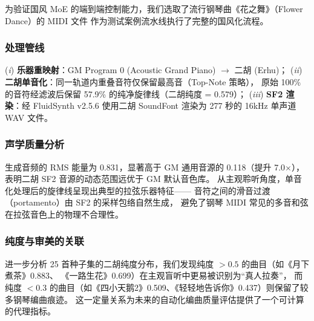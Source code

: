 \documentclass[UTF8,12pt,a4paper]{ctexart}
\begin{document}
为验证国风 MoE 的端到端控制能力，我们选取了流行钢琴曲《花之舞》（Flower Dance）的 MIDI 文件
作为测试案例流水线执行了完整的国风化流程。

\subsubsection{处理管线}

(\textit{i}) \textbf{乐器重映射}：GM Program 0 (Acoustic Grand Piano) $\rightarrow$ 二胡 (Erhu)；
(\textit{ii}) \textbf{二胡单音化}：同一轨道内重叠音符仅保留最高音（Top-Note 策略），
原始 100\% 的音符经滤波后保留 57.9\% 的纯净旋律线（二胡纯度 = 0.579）；
(\textit{iii}) \textbf{SF2 渲染}：经 FluidSynth v2.5.6 使用二胡 SoundFont 渲染为 277 秒的
16kHz 单声道 WAV 文件。

\subsubsection{声学质量分析}

生成音频的 RMS 能量为 0.831，显著高于 GM 通用音源的 0.118（提升 7.0$\times$），
表明二胡 SF2 音源的动态范围远优于 GM 默认音色库。
从主观聆听角度，单音化处理后的旋律线呈现出典型的拉弦乐器特征——
音符之间的滑音过渡（portamento）由 SF2 的采样包络自然生成，
避免了钢琴 MIDI 常见的多音和弦在拉弦音色上的物理不合理性。

\subsubsection{纯度与审美的关联}

进一步分析 25 首种子集的二胡纯度分布，我们发现纯度 $> 0.5$ 的曲目（如《月下煮茶》0.883、
《一路生花》0.699）在主观盲听中更易被识别为“真人拉奏”，
而纯度 $< 0.3$ 的曲目（如《四小天鹅2》0.509、《轻轻地告诉你》0.437）则保留了较多钢琴编曲痕迹。
这一定量关系为未来的自动化编曲质量评估提供了一个可计算的代理指标。
\end{document}
